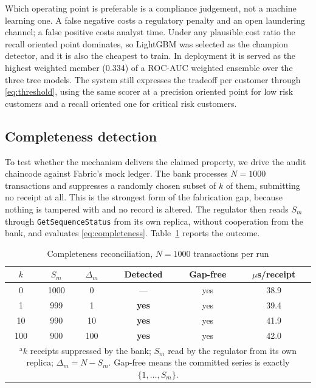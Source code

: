 \documentclass[conference]{IEEEtran}
\begin{document}
Which operating point is preferable is a compliance judgement, not a machine
learning one. A false negative costs a regulatory penalty and an open laundering
channel; a false positive costs analyst time. Under any plausible cost ratio the
recall oriented point dominates, so LightGBM was selected as the champion
detector, and it is also the cheapest to train. In deployment it is served as
the highest weighted member (0.334) of a ROC-AUC weighted ensemble over the
three tree models. The system still expresses the tradeoff per customer through
\eqref{eq:threshold}, using the same scorer at a precision oriented point for
low risk customers and a recall oriented one for critical risk customers.

\subsection{Completeness detection}
\label{sec:completenessexp}

To test whether the mechanism delivers the claimed property, we drive the audit
chaincode against Fabric's mock ledger. The bank processes $N=1000$ transactions
and suppresses a randomly chosen subset of $k$ of them, submitting no receipt at
all. This is the strongest form of the fabrication gap, because nothing is
tampered with and no record is altered. The regulator then reads $S_m$ through
\texttt{GetSequenceStatus} from its own replica, without cooperation from the
bank, and evaluates \eqref{eq:completeness}. Table~\ref{tab:completeness}
reports the outcome.

\begin{table}[htbp]
\caption{Completeness reconciliation, $N=1000$ transactions per run}
\begin{center}\footnotesize
\setlength{\tabcolsep}{4pt}
\begin{tabular}{|c|c|c|c|c|c|}
\hline
\textbf{$k$} & \textbf{$S_m$} & \textbf{$\Delta_m$} & \textbf{Detected} &
\textbf{Gap-free} & \textbf{$\mu$s/receipt}\\
\hline
0   & 1000 & 0   & ---           & yes & 38.9\\ \hline
1   & 999  & 1   & \textbf{yes}  & yes & 39.4\\ \hline
10  & 990  & 10  & \textbf{yes}  & yes & 41.9\\ \hline
100 & 900  & 100 & \textbf{yes}  & yes & 42.0\\
\hline
\multicolumn{6}{p{0.93\columnwidth}}{\footnotesize $^{\mathrm{a}}$$k$ receipts
suppressed by the bank; $S_m$ read by the regulator from its own replica;
$\Delta_m = N - S_m$. Gap-free means the committed series is exactly
$\{1,\dots,S_m\}$.}
\end{tabular}
\end{center}
\label{tab:completeness}
\end{table}
\end{document}
